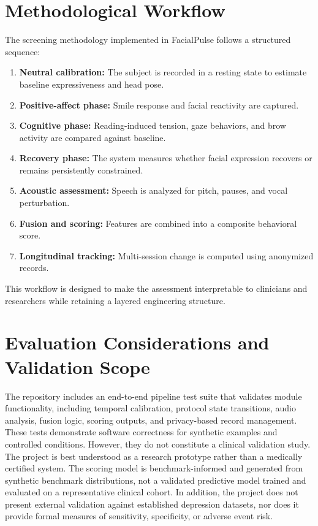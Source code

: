 \documentclass[conference, 12pt]{IEEEtran}
\begin{document}
\section{Methodological Workflow}
The screening methodology implemented in FacialPulse follows a structured sequence:
\begin{enumerate}[leftmargin=1.5em]
\item \textbf{Neutral calibration:} The subject is recorded in a resting state to estimate baseline expressiveness and head pose.
\item \textbf{Positive-affect phase:} Smile response and facial reactivity are captured.
\item \textbf{Cognitive phase:} Reading-induced tension, gaze behaviors, and brow activity are compared against baseline.
\item \textbf{Recovery phase:} The system measures whether facial expression recovers or remains persistently constrained.
\item \textbf{Acoustic assessment:} Speech is analyzed for pitch, pauses, and vocal perturbation.
\item \textbf{Fusion and scoring:} Features are combined into a composite behavioral score.
\item \textbf{Longitudinal tracking:} Multi-session change is computed using anonymized records.
\end{enumerate}
This workflow is designed to make the assessment interpretable to clinicians and researchers while retaining a layered engineering structure.
\section{Evaluation Considerations and Validation Scope}
The repository includes an end-to-end pipeline test suite that validates module functionality, including temporal calibration, protocol state transitions, audio analysis, fusion logic, scoring outputs, and privacy-based record management. These tests demonstrate software correctness for synthetic examples and controlled conditions. However, they do not constitute a clinical validation study.
The project is best understood as a research prototype rather than a medically certified system. The scoring model is benchmark-informed and generated from synthetic benchmark distributions, not a validated predictive model trained and evaluated on a representative clinical cohort. In addition, the project does not present external validation against established depression datasets, nor does it provide formal measures of sensitivity, specificity, or adverse event risk.
\end{document}
